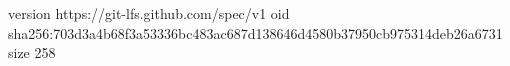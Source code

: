 version https://git-lfs.github.com/spec/v1
oid sha256:703d3a4b68f3a53336bc483ac687d138646d4580b37950cb975314deb26a6731
size 258
